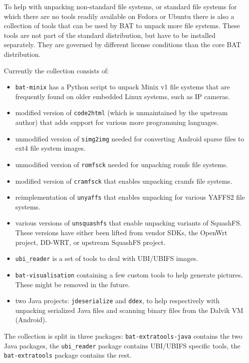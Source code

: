 \documentclass[10pt,a4paper]{article}
\begin{document}
To help with unpacking non-standard file systems, or standard file systems for
which there are no tools readily available on Fedora or Ubuntu there is also
a collection of tools that can be used by BAT to unpack more file systems.
These tools are not part of the standard distribution, but have to be installed
separately. They are governed by different license conditions than the core BAT
distribution.

Currently the collection consists of:

\begin{itemize}
\item \texttt{bat-minix} has a Python script to unpack Minix v1 file systems
that are frequently found on older embedded Linux systems, such as IP cameras.
\item modified version of \texttt{code2html} (which is unmaintained by the
upstream author) that adds support for various more programming languages.
\item unmodified version of \texttt{simg2img} needed for converting Android
sparse files to ext4 file system images.
\item unmodified version of \texttt{romfsck} needed for unpacking romfs file
systems.
\item modified version of \texttt{cramfsck} that enables unpacking cramfs
file systems.
\item reimplementation of \texttt{unyaffs} that enables unpacking for various
YAFFS2 file systems.
\item various versions of \texttt{unsquashfs} that enable unpacking variants
of SquashFS. These versions have either been lifted from vendor SDKs, the
OpenWrt project, DD-WRT, or upstream SquashFS project.
\item \texttt{ubi\_reader} is a set of tools to deal with UBI/UBIFS images.
\item \texttt{bat-visualisation} containing a few custom tools to help generate
pictures. These might be removed in the future.
\item two Java projects: \texttt{jdeserialize} and \texttt{ddex}, to help
respectively with unpacking serialized Java files and scanning binary files
from the Dalvik VM (Android).
\end{itemize}

The collection is split in three packages: \texttt{bat-extratools-java} contains
the two Java packages, the \texttt{ubi\_reader} package contains UBI/UBIFS
specific tools, the \texttt{bat-extratools} package contains the rest.
\end{document}
